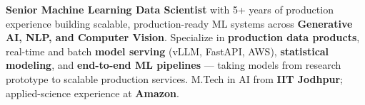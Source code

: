 \documentclass[letter,10pt]{article}
\begin{document}

\textbf{Senior Machine Learning Data Scientist} with 5+ years of production experience building scalable, production-ready ML systems across \textbf{Generative AI, NLP, and Computer Vision}.
Specialize in \textbf{production data products}, real-time and batch \textbf{model serving} (vLLM, FastAPI, AWS), \textbf{statistical modeling}, and \textbf{end-to-end ML pipelines} — taking models from research prototype to scalable production services.
M.Tech in AI from \textbf{IIT Jodhpur}; applied-science experience at \textbf{Amazon}.
\end{document}
